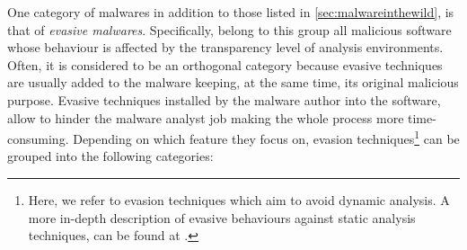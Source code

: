 \documentclass[LaM,binding=0.6cm]{sapthesis}
\begin{document}
One category of malwares in addition to those listed in \autoref{sec:malwareinthewild}, is that of \textit{evasive malwares}. Specifically, belong to this group all malicious software whose behaviour is affected by the transparency level of analysis environments. Often, it is considered to be an orthogonal category because evasive techniques are usually added to the malware keeping, at the same time, its original malicious purpose. Evasive techniques installed by the malware author into the software, allow to hinder the malware analyst job making the whole process more time-consuming.
\newpage
Depending on which feature they focus on, evasion techniques\footnote{Here, we refer to evasion techniques which aim to avoid dynamic analysis. A more in-depth description of evasive behaviours against static analysis techniques, can be found at \cite{moser2007limits}.} can be grouped into the following categories:
\end{document}
